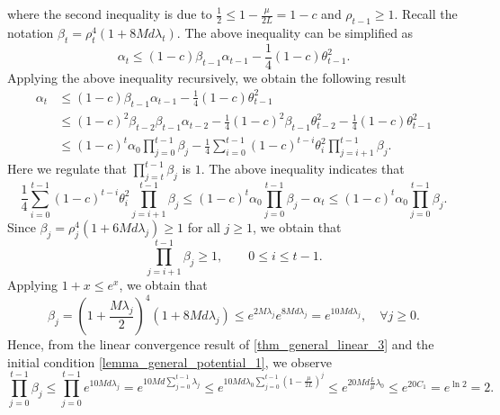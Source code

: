 \documentclass[11pt]{article}
\numberwithin{assumption}{section}
\numberwithin{remark}{section}
\numberwithin{theorem}{section}
\begin{document}
where the second inequality is due to $\frac{1}{2} \leq 1 - \frac{\mu}{2L} = 1 - c$ and $\rho_{t - 1} \geq 1$. Recall the notation $\beta_t = \rho_{t}^4 (1 + 8Md\lambda_{t})$. The above inequality can be simplified as
\begin{equation}
\alpha_t \leq (1 - c)\beta_{t - 1} \alpha_{t - 1} - \frac{1}{4}(1 - c)\theta_{t - 1}^2.
\end{equation}
Applying the above inequality recursively, we obtain the following result
\begin{equation}
\begin{split}
    \alpha_t & \leq (1 - c) \beta_{t - 1} \alpha_{t - 1} - \frac{1}{4}(1 - c)\theta_{t - 1}^2\\
    & \leq (1 - c)^2\beta_{t - 2}\beta_{t - 1} \alpha_{t - 2} - \frac{1}{4}(1 - c)^2\beta_{t - 1}\theta_{t - 2}^2 - \frac{1}{4}(1 - c)\theta_{t - 1}^2\\
    & \leq (1 - c)^t\alpha_0\prod_{j = 0}^{t - 1}\beta_j - \frac{1}{4}\sum_{i = 0}^{t - 1}(1 - c)^{t - i}\theta_{i}^2\prod_{j = i + 1}^{t - 1}\beta_j.
\end{split}
\end{equation}
Here we regulate that $\prod_{j = t}^{t - 1}\beta_j$ is $1$. The above inequality indicates that
\begin{equation}\label{proof_lemma_general_potential_17}
    \frac{1}{4}\sum_{i = 0}^{t - 1}(1 - c)^{t - i}\theta_{i}^2\prod_{j = i + 1}^{t - 1}\beta_j \leq (1 - c)^t\alpha_0\prod_{j = 0}^{t - 1}\beta_j - \alpha_t \leq (1 - c)^t\alpha_0\prod_{j = 0}^{t - 1}\beta_j.
\end{equation}
Since $\beta_j = \rho_{j}^4 (1 + 6Md\lambda_{j}) \geq 1$ for all $j \geq 1$, we obtain that
\begin{equation}\label{proof_lemma_general_potential_18}
    \prod_{j = i + 1}^{t - 1}\beta_j \geq 1, \qquad 0 \leq i \leq t - 1.
\end{equation}
Applying $1 + x \leq e^x$, we obtain that
\begin{equation}
\beta_j = (1 + \frac{M\lambda_j}{2})^4(1 + 8Md\lambda_j) \leq e^{2M\lambda_j}e^{8Md\lambda_j} = e^{10Md\lambda_j}, \quad \forall j \geq 0.
\end{equation}
Hence, from the linear convergence result of \eqref{thm_general_linear_3} and the initial condition \eqref{lemma_general_potential_1}, we observe
\begin{equation}\label{proof_lemma_general_potential_19}
    \prod_{j = 0}^{t - 1}\beta_j \leq \prod_{j = 0}^{t - 1}e^{10Md\lambda_j} = e^{10Md\sum_{j = 0}^{t - 1}\lambda_j} \leq e^{10Md\lambda_0\sum_{j = 0}^{t - 1}(1 - \frac{\mu}{2L})^j} \leq e^{20Md\frac{L}{\mu}\lambda_0} \leq e^{20C_1} = e^{\ln{2}} = 2.
\end{equation}
\end{document}
